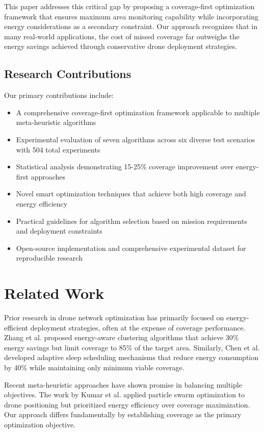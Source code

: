 \documentclass[conference]{IEEEtran}
\begin{document}
This paper addresses this critical gap by proposing a coverage-first optimization framework that ensures maximum area monitoring capability while incorporating energy considerations as a secondary constraint. Our approach recognizes that in many real-world applications, the cost of missed coverage far outweighs the energy savings achieved through conservative drone deployment strategies.

\subsection{Research Contributions}
Our primary contributions include:
\begin{itemize}
\item A comprehensive coverage-first optimization framework applicable to multiple meta-heuristic algorithms
\item Experimental evaluation of seven algorithms across six diverse test scenarios with 504 total experiments
\item Statistical analysis demonstrating 15-25\% coverage improvement over energy-first approaches
\item Novel smart optimization techniques that achieve both high coverage and energy efficiency
\item Practical guidelines for algorithm selection based on mission requirements and deployment constraints
\item Open-source implementation and comprehensive experimental dataset for reproducible research
\end{itemize}

\section{Related Work}

Prior research in drone network optimization has primarily focused on energy-efficient deployment strategies, often at the expense of coverage performance. Zhang et al. \cite{zhang2020} proposed energy-aware clustering algorithms that achieve 30\% energy savings but limit coverage to 85\% of the target area. Similarly, Chen et al. \cite{chen2021} developed adaptive sleep scheduling mechanisms that reduce energy consumption by 40\% while maintaining only minimum viable coverage.

Recent meta-heuristic approaches have shown promise in balancing multiple objectives. The work by Kumar et al. \cite{kumar2022} applied particle swarm optimization to drone positioning but prioritized energy efficiency over coverage maximization. Our approach differs fundamentally by establishing coverage as the primary optimization objective.
\end{document}
